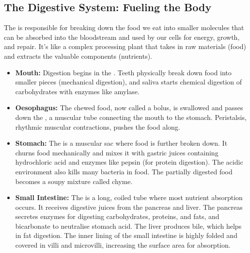\subsection{The Digestive System: Fueling the Body}

The  is responsible for breaking down the food we eat into smaller molecules that can be absorbed into the bloodstream and used by our cells for energy, growth, and repair.  It's like a complex processing plant that takes in raw materials (food) and extracts the valuable components (nutrients).

\begin{itemize}
    \item \textbf{Mouth:} Digestion begins in the . Teeth physically break down food into smaller pieces (mechanical digestion), and saliva starts chemical digestion of carbohydrates with enzymes like amylase. 

    \item \textbf{Oesophagus:}  The chewed food, now called a bolus, is swallowed and passes down the , a muscular tube connecting the mouth to the stomach.  Peristalsis, rhythmic muscular contractions, pushes the food along. 

    \item \textbf{Stomach:}  The  is a muscular sac where food is further broken down.  It churns food mechanically and mixes it with gastric juices containing hydrochloric acid and enzymes like pepsin (for protein digestion). The acidic environment also kills many bacteria in food. The partially digested food becomes a soupy mixture called chyme.

    \item \textbf{Small Intestine:}  The  is a long, coiled tube where most nutrient absorption occurs.  It receives digestive juices from the pancreas and liver.  The pancreas secretes enzymes for digesting carbohydrates, proteins, and fats, and bicarbonate to neutralise stomach acid. The liver produces bile, which helps in fat digestion. The inner lining of the small intestine is highly folded and covered in villi and microvilli, increasing the surface area for absorption. 


\end{itemize}
